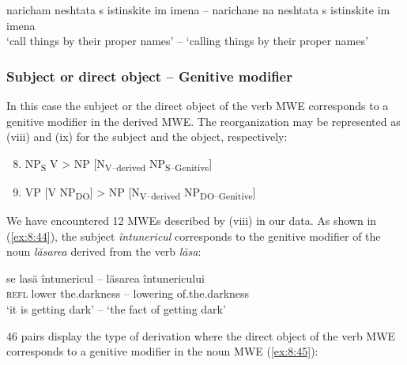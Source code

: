 \documentclass[output=paper]{langsci/langscibook}
\begin{document}
\begin{exe}
\ex \label{ex:8:43}
\settowidth{}
naricham neshtata s istinskite im imena –   narichane na
neshtata s istinskite im imena  \\
‘call things by their proper names’ – ‘calling things by their proper
names’
\end{exe}

\subsubsection{Subject or direct object – Genitive modifier}
\label{section632}

In this case the subject or the direct object of the verb MWE
corresponds to a genitive modifier in the derived MWE. The
reorganization may be represented as (viii) and (ix) for the subject
and the object, respectively:



\renewcommand{\theenumi}{(\roman{enumi})}%
\begin{enumerate}
 \setcounter{enumi}{7}
\item  NP\textsubscript{S} V > NP [N\textsubscript{V–derived}
NP\textsubscript{S–Genitive}]
\end{enumerate}

\renewcommand{\theenumi}{(\roman{enumi})}%
\begin{enumerate}
 \setcounter{enumi}{8}
\item VP [V NP\textsubscript{DO}] > NP [N\textsubscript{V–derived}
NP\textsubscript{DO–Genitive}]
\end{enumerate}


We have encountered 12 MWEs described by (viii) in our data. As shown in
(\ref{ex:8:44}), the subject \textit{întunericul} corresponds to the genitive modifier of
the noun \textit{lăsarea} derived from the verb \textit{lăsa}: 


\begin{exe}
\ex \label{ex:8:44}
\settowidth{}
\gll se lasă întunericul – lăsarea întunericului\\ 
\textsc{refl} lower {the.darkness} – {lowering} {of.the.darkness} \\
\glt ‘it is getting dark’ – ‘the fact of getting dark’
\end{exe}


46 pairs display the type of derivation where the direct object of the
verb MWE corresponds to a genitive modifier in the noun MWE (\ref{ex:8:45}): 
\end{document}
